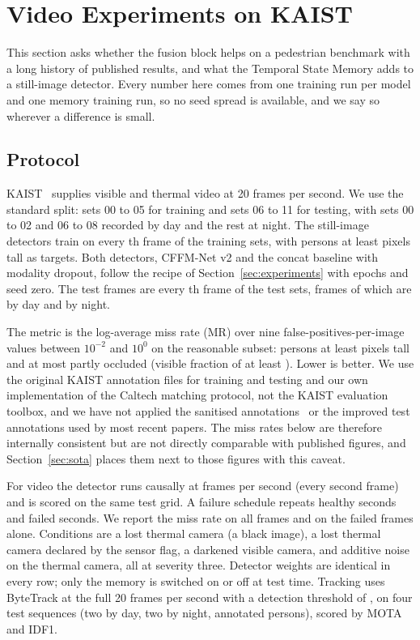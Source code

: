 \section{Video Experiments on KAIST}
\label{sec:video}
This section asks whether the fusion block helps on a pedestrian benchmark with a long history of published results, and what the Temporal State Memory adds to a still-image detector. Every number here comes from one training run per model and one memory training run, so no seed spread is available, and we say so wherever a difference is small.

\subsection{Protocol}
\label{sec:kaistprotocol}
KAIST~\cite{hwang2015kaist} supplies visible and thermal video at 20 frames per second. We use the standard split: sets 00 to 05 for training and sets 06 to 11 for testing, with sets 00 to 02 and 06 to 08 recorded by day and the rest at night. The still-image detectors train on every \cfgKaistTrainStride{}th frame of the training sets, with persons at least \cfgKaistTrainMinH{} pixels tall as targets. Both detectors, CFFM-Net v2 and the concat baseline with modality dropout, follow the recipe of Section~\ref{sec:experiments} with \cfgKaistEpochs{} epochs and seed zero. The test frames are every \cfgKaistTestStride{}th frame of the test sets, \kstNAll{} frames of which \kstNDay{} are by day and \kstNNight{} by night.

The metric is the log-average miss rate (MR) over nine false-positives-per-image values between $10^{-2}$ and $10^{0}$ on the reasonable subset: persons at least \cfgKaistMinH{} pixels tall and at most partly occluded (visible fraction of at least \cfgKaistMinVis{}). Lower is better. We use the original KAIST annotation files for training and testing and our own implementation of the Caltech matching protocol, not the KAIST evaluation toolbox, and we have not applied the sanitised annotations~\cite{li2018kaistsanitized} or the improved test annotations used by most recent papers. The miss rates below are therefore internally consistent but are not directly comparable with published figures, and Section~\ref{sec:sota} places them next to those figures with this caveat.

For video the detector runs causally at \cfgFailFps{} frames per second (every second frame) and is scored on the same test grid. A failure schedule repeats \cfgFailSeconds{} healthy seconds and \cfgFailSeconds{} failed seconds. We report the miss rate on all frames and on the failed frames alone. Conditions are a lost thermal camera (a black image), a lost thermal camera declared by the sensor flag, a darkened visible camera, and additive noise on the thermal camera, all at severity three. Detector weights are identical in every row; only the memory is switched on or off at test time. Tracking uses ByteTrack at the full 20 frames per second with a detection threshold of \cfgTrackConf{}, on four test sequences (two by day, two by night, \trkUniqueTotal{} annotated persons), scored by MOTA and IDF1.

